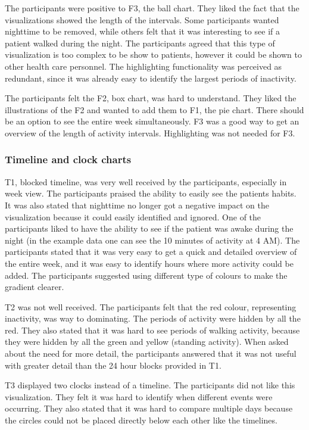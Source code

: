 The participants were positive to F3, the ball chart. They liked the fact that the visualizations showed the length of the intervals. Some participants wanted nighttime to be removed, while others felt that it was interesting to see if a patient walked during the night. The participants agreed that this type of visualization is too complex to be show to patients, however it could be shown to other health care personnel. The highlighting functionality was perceived as redundant, since it was already easy to identify the largest periods of inactivity.

The participants felt the F2, box chart, was hard to understand. They liked the illustrations of the F2 and wanted to add them to F1, the pie chart. There should be an option to see the entire week simultaneously. F3 was a good way to get an overview of the length of activity intervals. Highlighting was not needed for F3.

\subsubsection{Timeline and clock charts}
T1, blocked timeline, was very well received by the participants, especially in week view. The participants praised the ability to easily see the patients habits. It was also stated that nighttime no longer got a negative impact on the visualization because it could easily identified and ignored. One of the participants liked to have the ability to see if the patient was awake during the night (in the example data one can see the 10 minutes of activity at 4 AM). The participants stated that it was very easy to get a quick and detailed overview of the entire week, and it was easy to identify hours where more activity could be added. The participants suggested using different type of colours to make the gradient clearer.

T2 was not well received. The participants felt that the red colour, representing inactivity, was way to dominating. The periods of activity were hidden by all the red. They also stated that it was hard to see periods of walking activity, because they were hidden by all the green and yellow (standing activity). When asked about the need for more detail, the participants answered that it was not useful with greater detail than the 24 hour blocks provided in T1.

T3 displayed two clocks instead of a timeline. The participants did not like this visualization. They felt it was hard to identify when different events were occurring. They also stated that it was hard to compare multiple days because the circles could not be placed directly below each other like the timelines.

